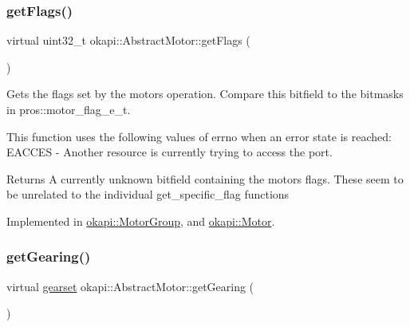 \mbox{\label{classokapi_1_1AbstractMotor_aaae44487bf20ac2e18b52ee57b7a06ad}} 
\subsubsection{\texorpdfstring{getFlags()}{getFlags()}}
{\footnotesize\ttfamily virtual uint32\+\_\+t okapi\+::\+Abstract\+Motor\+::get\+Flags (\begin{DoxyParamCaption}{ }\end{DoxyParamCaption})\hspace{0.3cm}{\ttfamily [pure virtual]}}

Gets the flags set by the motor\textquotesingle{}s operation. Compare this bitfield to the bitmasks in pros\+::motor\+\_\+flag\+\_\+e\+\_\+t.

This function uses the following values of errno when an error state is reached\+: E\+A\+C\+C\+ES -\/ Another resource is currently trying to access the port.

\begin{DoxyReturn}{Returns}
A currently unknown bitfield containing the motor\textquotesingle{}s flags. These seem to be unrelated to the individual get\+\_\+specific\+\_\+flag functions 
\end{DoxyReturn}


Implemented in \mbox{\hyperlink{classokapi_1_1MotorGroup_a5a8206be671413586f461a45132c9056}{okapi\+::\+Motor\+Group}}, and \mbox{\hyperlink{classokapi_1_1Motor_acb0097ba7ac778674efaa2c0765f6f3f}{okapi\+::\+Motor}}.

\mbox{\label{classokapi_1_1AbstractMotor_adc90f1fc8af6c34c4e833355693474bb}} 
\subsubsection{\texorpdfstring{getGearing()}{getGearing()}}
{\footnotesize\ttfamily virtual \mbox{\hyperlink{classokapi_1_1AbstractMotor_a88aaa6ea2fa10f5520a537bbf26774d5}{gearset}} okapi\+::\+Abstract\+Motor\+::get\+Gearing (\begin{DoxyParamCaption}{ }\end{DoxyParamCaption})\hspace{0.3cm}{\ttfamily [pure virtual]}}

